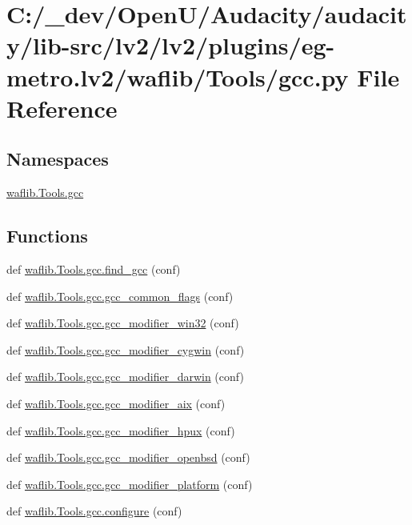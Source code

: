 \hypertarget{lv2_2plugins_2eg-metro_8lv2_2waflib_2_tools_2gcc_8py}{}\section{C\+:/\+\_\+dev/\+Open\+U/\+Audacity/audacity/lib-\/src/lv2/lv2/plugins/eg-\/metro.lv2/waflib/\+Tools/gcc.py File Reference}
\label{lv2_2plugins_2eg-metro_8lv2_2waflib_2_tools_2gcc_8py}
\subsection*{Namespaces}
\begin{DoxyCompactItemize}
\item 
 \hyperlink{namespacewaflib_1_1_tools_1_1gcc}{waflib.\+Tools.\+gcc}
\end{DoxyCompactItemize}
\subsection*{Functions}
\begin{DoxyCompactItemize}
\item 
def \hyperlink{namespacewaflib_1_1_tools_1_1gcc_adf21017012efdee616642ded5bb60683}{waflib.\+Tools.\+gcc.\+find\+\_\+gcc} (conf)
\item 
def \hyperlink{namespacewaflib_1_1_tools_1_1gcc_aa246ce31be40dc13e4667dccc88c659c}{waflib.\+Tools.\+gcc.\+gcc\+\_\+common\+\_\+flags} (conf)
\item 
def \hyperlink{namespacewaflib_1_1_tools_1_1gcc_ae9e66bb9518233bc92bb4dba88559396}{waflib.\+Tools.\+gcc.\+gcc\+\_\+modifier\+\_\+win32} (conf)
\item 
def \hyperlink{namespacewaflib_1_1_tools_1_1gcc_a5a86b1286220845f0499fde5bfd3276d}{waflib.\+Tools.\+gcc.\+gcc\+\_\+modifier\+\_\+cygwin} (conf)
\item 
def \hyperlink{namespacewaflib_1_1_tools_1_1gcc_a1bd8f384e014d4230087830a15403045}{waflib.\+Tools.\+gcc.\+gcc\+\_\+modifier\+\_\+darwin} (conf)
\item 
def \hyperlink{namespacewaflib_1_1_tools_1_1gcc_aaa265ca0c341d3de2b08c63f42ae800b}{waflib.\+Tools.\+gcc.\+gcc\+\_\+modifier\+\_\+aix} (conf)
\item 
def \hyperlink{namespacewaflib_1_1_tools_1_1gcc_aa4d75e5242d8ccd3cf9953b2ac22b0c2}{waflib.\+Tools.\+gcc.\+gcc\+\_\+modifier\+\_\+hpux} (conf)
\item 
def \hyperlink{namespacewaflib_1_1_tools_1_1gcc_a8dadf5c5d5221a13562c2fa8dab9a5cc}{waflib.\+Tools.\+gcc.\+gcc\+\_\+modifier\+\_\+openbsd} (conf)
\item 
def \hyperlink{namespacewaflib_1_1_tools_1_1gcc_a8b495579108d27d3a2ba7efe6fb32489}{waflib.\+Tools.\+gcc.\+gcc\+\_\+modifier\+\_\+platform} (conf)
\item 
def \hyperlink{namespacewaflib_1_1_tools_1_1gcc_abbff880dc3450c1e8e3ecebbd8eebbad}{waflib.\+Tools.\+gcc.\+configure} (conf)
\end{DoxyCompactItemize}
